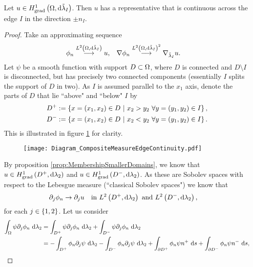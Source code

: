 \documentclass[11pt]{report}
\newcommand{\tlambda}{\tilde{\lambda}}
\begin{document}
\begin{theorem}
	Let $u\in\gradSob{\ddom}{\tlambda_I}$.
	Then $u$ has a representative that is continuous across the edge $I$ in the direction $\pm n_I$.
\end{theorem}
\begin{proof}
	Take an approximating sequence
	\begin{align*}
		\phi_n \lconv{\ltwo{\ddom}{\tlambda_I}} u, &\quad \grad\phi_n \lconv{\ltwo{\ddom}{\tlambda_I}^2} \grad_{\tlambda_I}u.
	\end{align*}
	Let $\psi$ be a smooth function with support $D\subset\Omega$, where $D$ is connected and $D\setminus I$ is disconnected, but has precisely two connected components (essentially $I$ splits the support of $D$ in two).
	As $I$ is assumed parallel to the $x_1$ axis, denote the parts of $D$ that lie ``above" and ``below" $I$ by
	\begin{align*}
		D^+ &:= \left\{ x=\left( x_1,x_2 \right)\in D \ \vert \ x_2>y_2 \ \forall y=\left( y_1,y_2 \right)\in I  \right\}, \\
		D^- &:= \left\{ x=\left( x_1,x_2 \right)\in D \ \vert \ x_2<y_2 \ \forall y=\left( y_1,y_2 \right)\in I  \right\}.
	\end{align*}
	This is illustrated in figure \ref{fig:Diagram_CompositeMeasureEdgeContinuity} for clarity.
	\begin{figure}[h]
		\centering
		\texttt{[image: Diagram\_CompositeMeasureEdgeContinuity.pdf]}
		\caption{\label{fig:Diagram_CompositeMeasureEdgeContinuity}}
	\end{figure}
	By proposition \ref{prop:MembershipSmallerDomains}, we know that $u\in H^1_\mathrm{grad}\left( D^+, \mathrm{d}\lambda_2 \right)$ and $u\in H^1_\mathrm{grad}\left( D^-, \mathrm{d}\lambda_2 \right)$.
	As these are Sobolev spaces with respect to the Lebesgue measure (``classical Sobolev spaces") we know that
	\begin{align*}
		\partial_j\phi_n \rightarrow \partial_j u &\quad\text{in } L^{2}\left( D^+,\mathrm{d}\lambda_2 \right) \text{ and } L^{2}\left( D^-,\mathrm{d}\lambda_2 \right),
	\end{align*}
	for each $j\in\left\{ 1,2 \right\}$.
	Let us consider
	\begin{align*}
		\int_{\Omega}\psi\partial_j\phi_n \ \mathrm{d}\lambda_2
		&= \int_{D^+}\psi\partial_j\phi_n \ \mathrm{d}\lambda_2 + \int_{D^-}\psi\partial_j\phi_n \ \mathrm{d}\lambda_2 \\
		&= -\int_{D^+}\phi_n\partial_j\psi \ \mathrm{d}\lambda_2 -\int_{D^-}\phi_n\partial_j\psi \ \mathrm{d}\lambda_2 + \int_{\partial D^+}\phi_n\psi n^+ \ \mathrm{d}s + \int_{\partial D^-}\phi_n\psi n^- \ \mathrm{d}s,
	\end{align*}

\end{proof}
\end{document}
